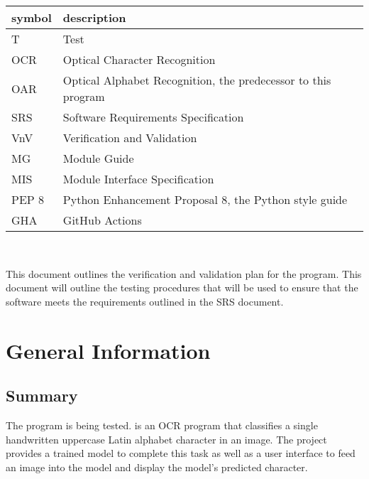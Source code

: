 \documentclass[12pt, titlepage]{article}
\begin{document}
\renewcommand{\arraystretch}{1.2}
\begin{tabular}{l l} 
  \toprule		
  \textbf{symbol} & \textbf{description}\\
  \midrule 
  T & Test\\
  OCR & Optical Character Recognition\\
  OAR & Optical Alphabet Recognition, the predecessor to this program\\
  SRS & Software Requirements Specification\\
  VnV & Verification and Validation\\
  MG & Module Guide\\
  MIS & Module Interface Specification\\
  PEP 8 & Python Enhancement Proposal 8, the Python style guide\\
  GHA & GitHub Actions\\
  \bottomrule
\end{tabular}\\



\newpage


This document outlines the verification and validation plan for the \progname{}
program. This document will outline the testing procedures that will be used to
ensure that the software meets the requirements outlined in the SRS document.

\section{General Information}

\subsection{Summary}

The \progname{} program is being tested. \progname{} is an OCR program that classifies
a single handwritten uppercase Latin alphabet character in an image. The project
provides a trained model to complete this task as well as a user interface to
feed an image into the model and display the model's predicted character.

\end{document}
